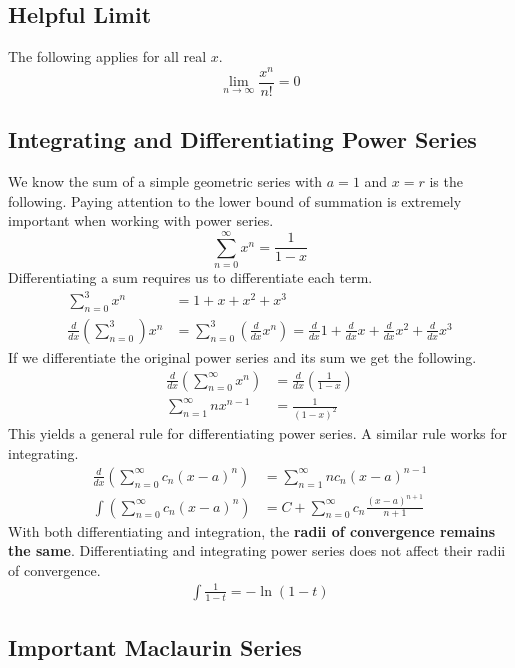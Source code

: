 \documentclass[12pt]{article}
\begin{document}
\subsection{Helpful Limit}

The following applies for all real $x$.
$$
\lim_{n \to \infty} \frac{x^n}{n!} = 0
$$


\subsection{Integrating and Differentiating Power Series}

We know the sum of a simple geometric series with $a = 1$ and $x = r$ is the following. Paying attention to the lower bound of summation is extremely important when working with power series.
$$
\sum_{n=0}^{\infty} x^n = \frac{1}{1-x}
$$
Differentiating a sum requires us to differentiate each term.
\begin{align*}
    \sum_{n=0}^{3} x^n &= 1 + x + x^2 + x^3\\
    \frac{d}{dx}\left(\sum_{n=0}^{3}\right) x^n &= \sum_{n=0}^{3} \left(\frac{d}{dx}x^n\right) = \frac{d}{dx}1 + \frac{d}{dx}x + \frac{d}{dx}x^2 + \frac{d}{dx}x^3
\end{align*}
If we differentiate the original power series and its sum we get the following.
\begin{align*}
    \frac{d}{dx}\left(\sum_{n=0}^{\infty} x^n\right) &= \frac{d}{dx}\left(\frac{1}{1-x}\right)\\
    \sum_{n=1}^{\infty} nx^{n-1} &= \frac{1}{(1-x)^2}
\end{align*}
This yields a general rule for differentiating power series. A similar rule works for integrating.
\begin{align*}
    \frac{d}{dx}\left( \sum_{n=0}^{\infty} c_n(x-a)^n \right) &= \sum_{n=1}^{\infty} nc_n(x-a)^{n-1}\\
    \int \left( \sum_{n=0}^{\infty} c_n(x-a)^n \right) &= C + \sum_{n=0}^{\infty} c_n \frac{(x-a)^{n+1}}{n+1}
\end{align*}
With both differentiating and integration, the \textbf{radii of convergence remains the same}. Differentiating and integrating power series does not affect their radii of convergence.
\begin{align*}
    \int \frac{1}{1-t} = - \ln(1-t)
\end{align*}


\subsection{Important Maclaurin Series}
\end{document}
